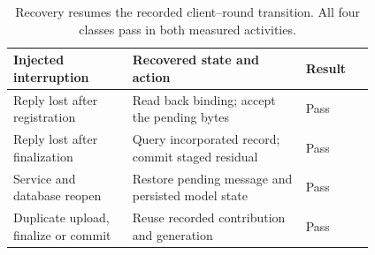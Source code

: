 \begin{table}[!htb]\centering\small
\caption{Recovery resumes the recorded client--round transition. All four classes pass in both measured activities.}\label{tab:recovery}
\setlength{\tabcolsep}{4pt}
\begin{tabular}{p{0.33\linewidth}p{0.48\linewidth}l}\toprule
Injected interruption & Recovered state and action & Result\\\midrule
Reply lost after registration & Read back binding; accept the pending bytes & Pass\\
Reply lost after finalization & Query incorporated record; commit staged residual & Pass\\
Service and database reopen & Restore pending message and persisted model state & Pass\\
Duplicate upload, finalize or commit & Reuse recorded contribution and generation & Pass\\\bottomrule
\end{tabular}
\end{table}

